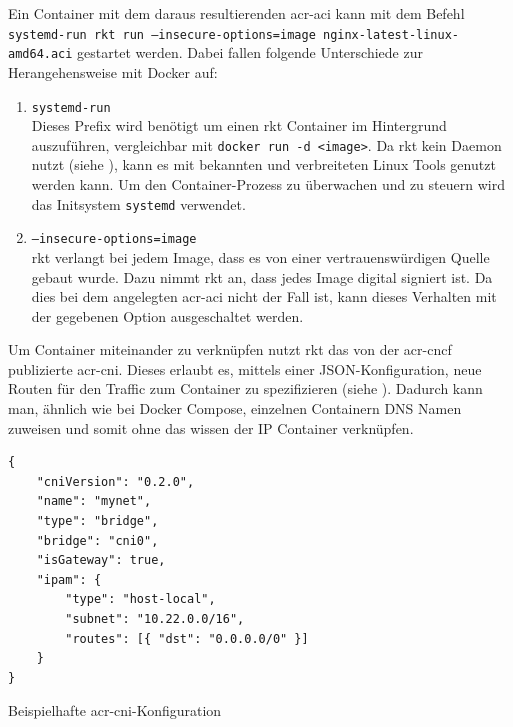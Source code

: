Ein Container mit dem daraus resultierenden \gls{acr-aci} kann mit dem Befehl \texttt{systemd-run rkt run --insecure-options=image nginx-latest-linux-amd64.aci} gestartet werden. Dabei fallen folgende Unterschiede zur Herangehensweise mit Docker auf:
\begin{enumerate}
	\item \texttt{systemd-run} \\ 
	Dieses Prefix wird benötigt um einen rkt Container im Hintergrund auszuführen, vergleichbar mit \texttt{docker run -d <image>}. Da rkt kein Daemon nutzt (siehe ), kann es mit bekannten und verbreiteten Linux Tools genutzt werden kann. Um den Container-Prozess zu überwachen und zu steuern wird das Initsystem \texttt{systemd} verwendet.
	\item \texttt{--insecure-options=image} \\
	rkt verlangt bei jedem Image, dass es von einer vertrauenswürdigen Quelle gebaut wurde. Dazu nimmt rkt an, dass jedes Image digital signiert ist. Da dies bei dem angelegten \gls{acr-aci} nicht der Fall ist, kann dieses Verhalten mit der gegebenen Option ausgeschaltet werden.
\end{enumerate}

Um Container miteinander zu verknüpfen nutzt rkt das von der \gls{acr-cncf} publizierte \gls{acr-cni}. Dieses erlaubt es, mittels einer JSON-Konfiguration, neue Routen für den Traffic zum Container zu spezifizieren (siehe ). Dadurch kann man, ähnlich wie bei Docker Compose, einzelnen Containern DNS Namen zuweisen und somit ohne das wissen der IP Container verknüpfen.

\begin{listing}[h]
	\begin{verbatim}
{
	"cniVersion": "0.2.0",
	"name": "mynet",
	"type": "bridge",
	"bridge": "cni0",
	"isGateway": true,
	"ipam": {
		"type": "host-local",
		"subnet": "10.22.0.0/16",
		"routes": [{ "dst": "0.0.0.0/0" }]
	}
}
	\end{verbatim}
	\caption{Beispielhafte \gls{acr-cni}-Konfiguration}
	\label{lst:cniConfig}
\end{listing}

